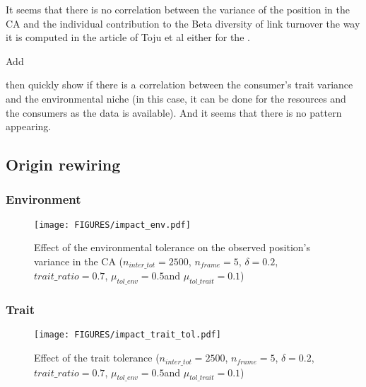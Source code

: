 It seems that there is no correlation between the variance of the position in the CA and the individual contribution to the Beta diversity of link turnover the way it is computed in the article of Toju et al either for the .


Add 


then quickly show if there is a correlation between the consumer's trait variance and the environmental niche (in this case, it can be done for the resources and the consumers as the data is available). And it seems that there is no pattern appearing.


\subsection{Origin rewiring}

\subsubsection{Environment}

\begin{figure}[H]
    \centering
    \texttt{[image: FIGURES/impact\_env.pdf]}
    \caption{Effect of the environmental tolerance on the observed position's variance in the CA ($n_{inter\_tot} = 2500$, $n_{frame} = 5$, $\delta =  0.2$, $trait\_ratio = 0.7$, $\mu_{tol\_env} = 0.5$and $\mu_{tol\_trait} = 0.1$)}
    \label{fig:enter-label}
\end{figure}


\subsubsection{Trait}

\begin{figure}[H]
    \centering
    \texttt{[image: FIGURES/impact\_trait\_tol.pdf]}
    \caption{Effect of the trait tolerance ($n_{inter\_tot} = 2500$, $n_{frame} = 5$, $\delta =  0.2$, $trait\_ratio = 0.7$, $\mu_{tol\_env} = 0.5$and $\mu_{tol\_trait} = 0.1$)}
    \label{fig:enter-label}
\end{figure}